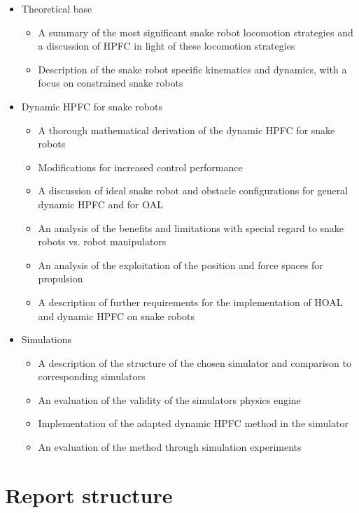 \begin{itemize}
    \item Theoretical base
    \begin{itemize}
        \item A summary of the most significant snake robot locomotion strategies and a discussion of HPFC in light of these locomotion strategies
        \item Description of the snake robot specific kinematics and dynamics, with a focus on constrained snake robots
    \end{itemize}
    
    \item Dynamic HPFC for snake robots
    \begin{itemize}
        \item A thorough mathematical derivation of the dynamic HPFC for snake robots
        \item Modifications for increased control performance
        \item A discussion of ideal snake robot and obstacle configurations for general dynamic HPFC and for OAL
        \item An analysis of the benefits and limitations with special regard to snake robots vs. robot manipulators
        \item An analysis of the exploitation of the position and force spaces for propulsion
        \item A description of further requirements for the implementation of HOAL and dynamic HPFC on snake robots 
    \end{itemize}
    
    \item Simulations
    \begin{itemize}
        \item A description of the structure of the chosen simulator and comparison to corresponding simulators
        \item An evaluation of the validity of the simulators physics engine
        \item Implementation of the adapted dynamic HPFC method in the simulator
        \item An evaluation of the method through simulation experiments
    \end{itemize}

\end{itemize}


\section{Report structure}


